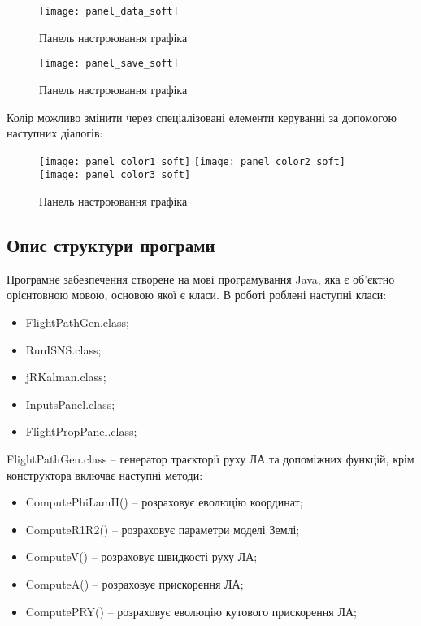 \begin{figure}[h!]
\centering
\texttt{[image: panel\_data\_soft]}
\caption{Панель настроювання графіка}\label{fig:panel_data_soft}
\end{figure}

\begin{figure}[H]
\centering
\texttt{[image: panel\_save\_soft]}
\caption{Панель настроювання графіка}\label{fig:panel_save_soft}
\end{figure}
Колір можливо змінити через спеціалізовані елементи керуванні за допомогою наступних діалогів: 
\begin{figure}[H]
\centering
\texttt{[image: panel\_color1\_soft]}
\texttt{[image: panel\_color2\_soft]}
\texttt{[image: panel\_color3\_soft]}
\caption{Панель настроювання графіка}\label{fig:panel_color_soft}
\end{figure}

\subsection{Опис структури програми}

Програмне забезпечення створене на мові програмування Java, яка є об'єктно орієнтовною мовою, основою якої є класи. В роботі роблені наступні класи:
\begin{itemize}
 \item FlightPathGen.class;
 \item RunISNS.class;
 \item jRKalman.class;
 \item InputsPanel.class;
 \item FlightPropPanel.class;
\end{itemize}

FlightPathGen.class -- генератор траєкторії руху ЛА та допоміжних функцій, крім конструктора включає наступні методи:

\begin{itemize}
 \item ComputePhiLamH() -- розраховує еволюцію координат;
 \item ComputeR1R2() -- розраховує параметри моделі Землі;
 \item ComputeV() -- розраховує швидкості руху ЛА;
 \item ComputeA() -- розраховує прискорення ЛА;
 \item ComputePRY() -- розраховує еволюцію кутового прискорення ЛА;
\end{itemize}


